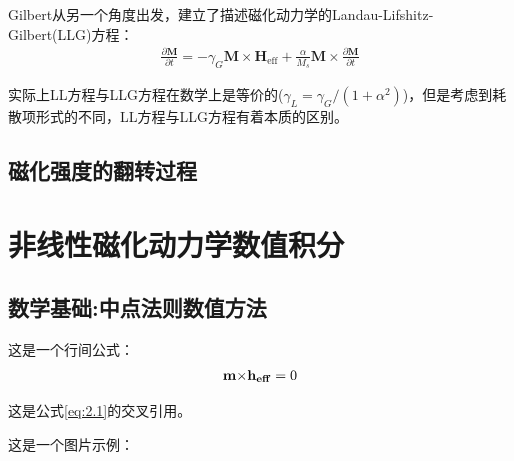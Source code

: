 	Gilbert从另一个角度出发，建立了描述磁化动力学的Landau-Lifshitz-Gilbert(LLG)方程：
	\begin{align}
	\frac{\partial \mathbf{M}}{\partial t}=-\gamma_G \mathbf{M} \times \mathbf{H}_{\mathrm{eff}}+\frac{\alpha}{M_{s}} \mathbf{M} \times \frac{\partial \mathbf{M}}{\partial t} \label{eq:1.8}
	\end{align}
	
	实际上LL方程与LLG方程在数学上是等价的($ {\gamma _L} = {\gamma _G}/(1 + {\alpha ^2}) $)，但是考虑到耗散项形式的不同，LL方程与LLG方程有着本质的区别。
	
	\section{磁化强度的翻转过程}
	
	
	
	
	\chapter{非线性磁化动力学数值积分}
	\section{数学基础:中点法则数值方法}
	这是一个行间公式：
	\begin{align}
	{\bf{m \times }}{{\bf{h}}_{{\bf{eff}}}} = 0  \label{eq:2.1}
	\end{align}
	
	这是公式\ref{eq:2.1}的交叉引用。
	
		这是一个图片示例：
	
